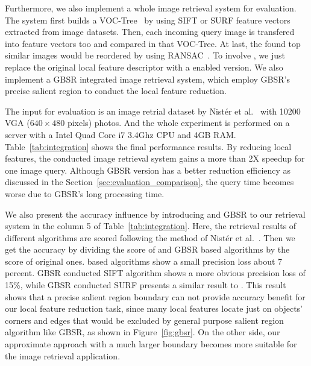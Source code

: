Furthermore, we also implement a whole image retrieval system for evaluation. The system first builds a VOC-Tree~\cite{nister-stewenius-cvpr-2006} by using SIFT or SURF feature vectors extracted from image datasets. Then, each incoming query image is transfered into feature vectors too and compared in that VOC-Tree. At last, the found top similar images would be reordered by using RANSAC~\cite{ransac1981}. To involve {\sys}, we just replace the original local feature descriptor with a {\sys} enabled version. We also implement a GBSR integrated image retrieval system, which employ GBSR's precise salient region to conduct the local feature reduction.

The input for evaluation is an image retrial dataset by Nist\'er et al.~\cite{nister-stewenius-cvpr-2006} with 10200 VGA ($640\times480$ pixels) photos. And the whole experiment is performed on a server with a Intel Quad Core i7 3.4Ghz CPU and 4GB RAM. Table~\ref{tab:integration} shows the final performance results. By reducing local features, the {\sys} conducted image retrieval system gains a more than 2X speedup for one image query. Although GBSR version has a better reduction efficiency as discussed in the Section~\ref{sec:evaluation_comparison}, the query time becomes worse due to GBSR's long processing time.

We also present the accuracy influence by introducing {\sys} and GBSR to our retrieval system in the column 5 of Table~\ref{tab:integration}. Here, the retrieval results of different algorithms are scored following the method of Nist\'er et al.~\cite{nister-stewenius-cvpr-2006}. Then we get the accuracy by dividing the score of {\sys} and GBSR based algorithms by the score of original ones. {\sys} based algorithms show a small precision loss about 7 percent. GBSR conducted SIFT algorithm shows a more obvious precision loss of 15\%, while GBSR conducted SURF presents a similar result to {\sys}. This result shows that a precise salient region boundary can not provide accuracy benefit for our local feature reduction task, since many local features locate just on objects' corners and edges that would be excluded by general purpose salient region algorithm like GBSR, as shown in Figure~\ref{fig:gbsr}. On the other side, our approximate approach with a much larger boundary becomes more suitable for the image retrieval application.

